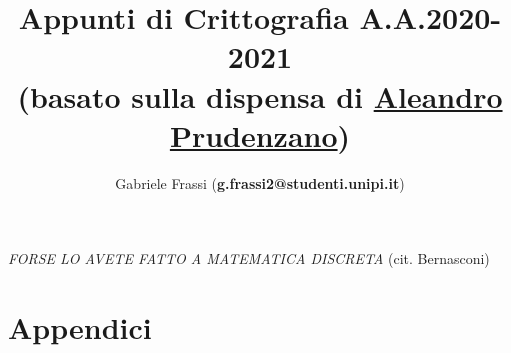 \documentclass[11pt]{report}
\begin{document}
	\title{\textbf{Appunti di  Crittografia A.A.2020-2021}\\(basato sulla dispensa di \href{https://github.com/drw0if/Appunti/tree/main/Crittografia}{Aleandro Prudenzano})}
	\author{Gabriele Frassi (\textbf{g.frassi2@studenti.unipi.it})}
	\maketitle
	
	\noindent \emph{FORSE LO AVETE FATTO A MATEMATICA DISCRETA} (cit. Bernasconi)
	
	\doclicenseThis
		
	\thispagestyle{empty}
	\clearpage 
	
	\setcounter{page}{1}
	
	\tableofcontents
	
	
	
	
	
	
	
	
	
	
	
	
	
	
	
	
	
	
	
	

	\appendix 

	\part{Appendici}
	
	
	
\end{document}

